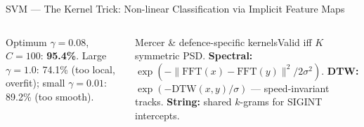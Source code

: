 \documentclass[aspectratio=169,10pt,t]{beamer}
\begin{document}
\begin{frame}{SVM --- The Kernel Trick: Non-linear Classification via Implicit Feature Maps}
\begin{columns}[T]
{\begin{tikzpicture}[x=1.15cm,y=0.5cm]
\end{tikzpicture}}
\begin{rbox}\scriptsize Optimum $\gamma=0.08$, $C=100$: \textbf{95.4\%}. Large $\gamma=1.0$: 74.1\% (too local, overfit); small $\gamma=0.01$: 89.2\% (too smooth).\end{rbox}
\begin{cbox}[ISSAnavy]{Mercer \& defence-specific kernels}\scriptsize Valid iff $K$ symmetric PSD. \textbf{Spectral:} $\exp(-\|\text{FFT}(x)-\text{FFT}(y)\|^2/2\sigma^2)$. \textbf{DTW:} $\exp(-\text{DTW}(x,y)/\sigma)$ --- speed-invariant tracks. \textbf{String:} shared $k$-grams for SIGINT intercepts.\end{cbox}
\end{columns}
\end{frame}

\end{document}
